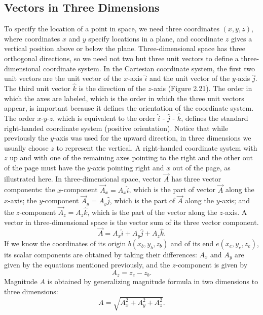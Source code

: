 \documentclass{report}
\begin{document}
        \pagebreak \bigbreak \noindent 
        \subsection{Vectors in Three Dimensions}
        \bigbreak \noindent 
        To specify the location of a point in space, we need three coordinates $(x, y, z)$, where coordinates $x$ and $y$ specify locations in a plane, and coordinate $z$ gives a vertical position above or below the plane. Three-dimensional space has three orthogonal directions, so we need not two but three unit vectors to define a three-dimensional coordinate system. In the Cartesian coordinate system, the first two unit vectors are the unit vector of the $x$-axis $\hat{i}$ and the unit vector of the $y$-axis $\hat{j}$. The third unit vector $\hat{k}$ is the direction of the $z$-axis (Figure 2.21). The order in which the axes are labeled, which is the order in which the three unit vectors appear, is important because it defines the orientation of the coordinate system. The order $x$-$y$-$z$, which is equivalent to the order $\hat{i}$ - $\hat{j}$ - $\hat{k}$, defines the standard right-handed coordinate system (positive orientation). Notice that while previously the $y$-axis was used for the upward direction, in three dimensions we usually choose $z$ to represent the vertical. A right-handed coordinate system with $z$ up and with one of the remaining axes pointing to the right and the other out of the page must have the $y$-axis pointing right and $x$ out of the page, as illustrated here.
        \bigbreak \noindent 
        In three-dimensional space, vector $\vec{A}$ has three vector components: the $x$-component $\vec{A}_x = A_x \hat{i}$, which is the part of vector $\vec{A}$ along the $x$-axis; the $y$-component $\vec{A}_y = A_y \hat{j}$, which is the part of $\vec{A}$ along the $y$-axis; and the $z$-component $\vec{A}_z = A_z \hat{k}$, which is the part of the vector along the $z$-axis. A vector in three-dimensional space is the vector sum of its three vector component. 
        \[
            \vec{A} = A_x \hat{i} + A_y \hat{j} + A_z \hat{k}.
        \]
        If we know the coordinates of its origin $b(x_b, y_b, z_b)$ and of its end $e(x_e, y_e, z_e)$, its scalar components are obtained by taking their differences: $A_x$ and $A_y$ are given by the equations mentioned previously, and the $z$-component is given by
        \[
            A_z = z_e - z_b.
        \]
        Magnitude $A$ is obtained by generalizing magnitude formula in two dimensions to three dimensions:
        \[
            A = \sqrt{A_x^2 + A_y^2 + A_z^2}.
        \]






    


    





    \pagebreak 


    \pagebreak 
\end{document}
